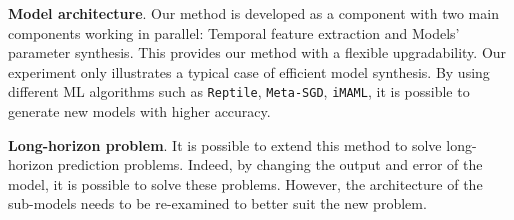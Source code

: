 
\textbf{Model architecture}. Our method is developed as a component with two main components working in parallel: Temporal feature extraction and Models' parameter synthesis. This provides our method with a flexible upgradability. Our experiment only illustrates a typical case of efficient model synthesis. By using different ML algorithms such as \verb|Reptile|, \verb|Meta-SGD|, \verb|iMAML|, it is possible to generate new models with higher accuracy.


\textbf{Long-horizon problem}. It is possible to extend this method to solve long-horizon prediction problems. Indeed, by changing the output and error of the model, it is possible to solve these problems. However, the architecture of the sub-models needs to be re-examined to better suit the new problem.
